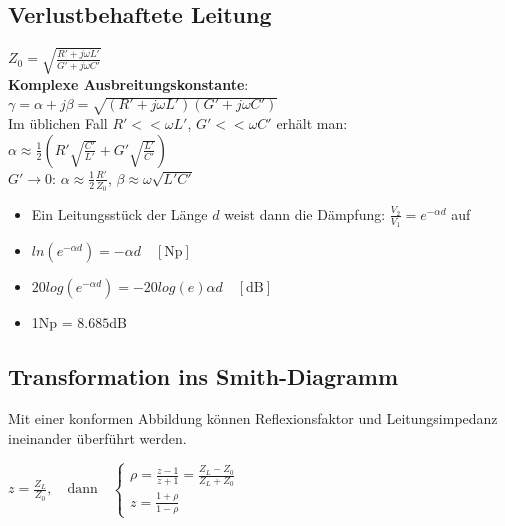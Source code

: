 \documentclass[english]{latex4ei/latex4ei_sheet}
\begin{document}
\begin{sectionbox}
    \subsection{Verlustbehaftete Leitung}
    $Z_0 = \sqrt{\frac{R' +j\omega L'}{G' + j\omega C'}}$\\
    \textbf{Komplexe Ausbreitungskonstante}:\\

    $\gamma = \alpha + j\beta = \sqrt{(R' + j\omega L')(G'+j\omega C')}$\\
    Im üblichen Fall $R' << \omega L'$, $G' << \omega C'$ erhält man:\\

    $\alpha \approx \frac{1}{2}\left(R'\sqrt{\frac{C'}{L'}} + G'\sqrt{\frac{L'}{C'}} \right)$\\
    $G' \to 0$: $\alpha \approx \frac{1}{2} \frac{R'}{Z_0}$, $\beta \approx \omega\sqrt{L'C'}$\\

    \begin{itemize}
        \item Ein Leitungsstück der Länge $d$ weist dann die Dämpfung: $\frac{V_2}{V_1}=e^{-\alpha d}$ auf
        \item $ln(e^{-\alpha d}) = -\alpha d \quad[\text{Np}]$
        \item $20log(e^{-\alpha d}) = -20log(e)\alpha d \quad [\text{dB}]$
        \item 1Np = $8.685$dB
    \end{itemize}
\end{sectionbox}
\begin{sectionbox}
    \subsection{Transformation ins Smith-Diagramm}
    Mit einer konformen Abbildung können Reflexionsfaktor und Leitungsimpedanz ineinander überführt werden.\\
    \begin{emphbox}
        $z=\frac{Z_L}{Z_0}, \quad \text{dann} \quad \begin{cases}
                \rho = \frac{z-1}{z+1} = \frac{Z_L-Z_0}{Z_L+Z_0} \\
                z = \frac{1+\rho}{1-\rho}
            \end{cases}$
    \end{emphbox}

\end{sectionbox}
\end{document}
